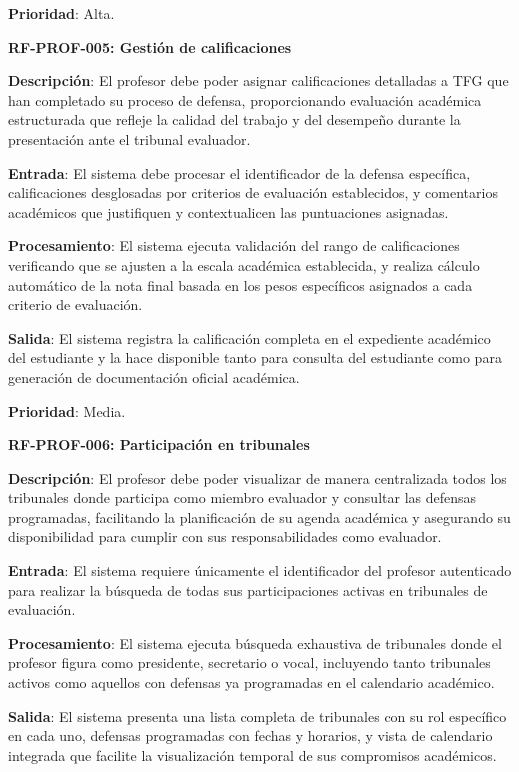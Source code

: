 \documentclass[12pt,a4paper,oneside]{report}
\begin{document}
\textbf{Prioridad}: Alta.

\textbf{RF-PROF-005: Gestión de calificaciones}

\textbf{Descripción}: El profesor debe poder asignar calificaciones detalladas a TFG que han completado su proceso de defensa, proporcionando evaluación académica estructurada que refleje la calidad del trabajo y del desempeño durante la presentación ante el tribunal evaluador.

\textbf{Entrada}: El sistema debe procesar el identificador de la defensa específica, calificaciones desglosadas por criterios de evaluación establecidos, y comentarios académicos que justifiquen y contextualicen las puntuaciones asignadas.

\textbf{Procesamiento}: El sistema ejecuta validación del rango de calificaciones verificando que se ajusten a la escala académica establecida, y realiza cálculo automático de la nota final basada en los pesos específicos asignados a cada criterio de evaluación.

\textbf{Salida}: El sistema registra la calificación completa en el expediente académico del estudiante y la hace disponible tanto para consulta del estudiante como para generación de documentación oficial académica.

\textbf{Prioridad}: Media.

\textbf{RF-PROF-006: Participación en tribunales}

\textbf{Descripción}: El profesor debe poder visualizar de manera centralizada todos los tribunales donde participa como miembro evaluador y consultar las defensas programadas, facilitando la planificación de su agenda académica y asegurando su disponibilidad para cumplir con sus responsabilidades como evaluador.

\textbf{Entrada}: El sistema requiere únicamente el identificador del profesor autenticado para realizar la búsqueda de todas sus participaciones activas en tribunales de evaluación.

\textbf{Procesamiento}: El sistema ejecuta búsqueda exhaustiva de tribunales donde el profesor figura como presidente, secretario o vocal, incluyendo tanto tribunales activos como aquellos con defensas ya programadas en el calendario académico.

\textbf{Salida}: El sistema presenta una lista completa de tribunales con su rol específico en cada uno, defensas programadas con fechas y horarios, y vista de calendario integrada que facilite la visualización temporal de sus compromisos académicos.
\end{document}
